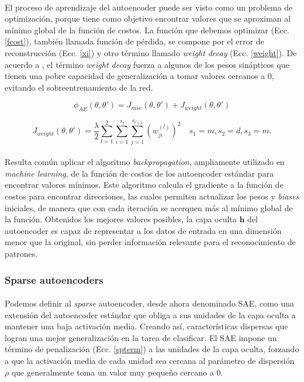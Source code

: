 \documentclass[12pt]{article}
\begin{document}
\paragraph{}
El proceso de aprendizaje del autoencoder puede ser visto como un problema de optimización, porque tiene como objetivo encontrar valores que se aproximan al mínimo global de la función de costos. La función que debemos optimizar (Ecc. \ref{fcost}), también llamada función de pérdida, se compone por el error de reconstrucción (Ecc. \ref{xi}) y otro término llamado \textit{weight decay} (Ecc. \ref{weight}). De acuerdo a \cite{haykin}, el término \textit{weight decay} fuerza a algunos de los pesos sinápticos que tienen una pobre capacidad de generalización a tomar valores cercanos a 0,  evitando el sobreentrenamiento de la red.

\begin{equation}
\label{fcost}
\phi_{AE}(\theta,\theta')= J_{mse}(\theta,\theta') + J_{weight}(\theta,\theta')
\end{equation} 

\begin{equation}
\label{weight}
J_{weight}(\theta,\theta')=\frac{\lambda}{2}\sum_{l=1}^{2}\sum_{i=1}^{s_l}\sum_{j=1}^{s_{l+1}}({w^{(l)}_{ji}})^2 \quad s_{1}=m,s_{2}=d,s_{3}=m.
\end{equation}

\paragraph{}
Resulta común aplicar el algoritmo \textit{backpropagation}, ampliamente utilizado en \textit{machine learning}, de la función de costos de los autoencoder estándar para encontrar valores mínimos. Este algoritmo calcula el gradiente a la función de costos para encontrar direcciones, las cuales permiten actualizar los pesos y \textit{biases} iniciales, de manera que con cada iteración se acerquen más al mínimo global de la función. Obtenidos los mejores valores posibles, la capa oculta $\textbf{h}$ del autoencoder es capaz de representar a los datos de entrada en una dimensión menor que la original, sin perder información relevante para el reconocimiento de patrones.

\subsubsection{Sparse autoencoders}

\paragraph{}
Podemos definir al \textit{sparse} autoencoder, desde ahora denominado SAE, como una extensión del autoencoder estándar que obliga a sus unidades de la capa oculta a mantener una baja activación media. Creando así, características dispersas que logran una mejor generalización en la tarea de clasificar\cite{du}. El SAE impone un término de penalización (Ecc. \ref{spterm}) a las unidades de la capa oculta, forzando a que la activación media de cada unidad sea cercana al parámetro de dispersión $\rho$ que generalmente toma un valor muy pequeño cercano a 0. 
\end{document}
